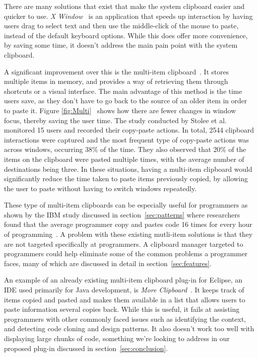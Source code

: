 \documentclass{acm_proc_article-sp}
\begin{document}
There are many solutions that exist that make the system clipboard easier and quicker to use. \textit{X Window}~\cite{overlapWindow} is an application that speeds up interaction by having users drag to select text and then use the middle-click of the mouse to paste, instead of the default keyboard options. While this does offer more convenience, by saving some time, it doesn't address the main pain point with the system clipboard.

A significant improvement over this is the multi-item clipboard~\cite{cpHabits}. It stores multiple items in memory, and provides a way of retrieving them through shortcuts or a visual interface. The main advantage of this method is the time users save, as they don't have to go back to the source of an older item in order to paste it. Figure \ref{fig:Multi}~\cite{cpHabits} shows how there are fewer changes in window focus, thereby saving the user time. The study conducted by Stolee et al. monitored 15 users and recorded their copy-paste actions. In total, 2544 clipboard interactions were captured and the most frequent type of copy-paste actions was across windows, occurring 38\% of the time. They also observed that 20\% of the items on the clipboard were pasted multiple times, with the average number of destinations being three. In these situations, having a multi-item clipboard would significantly reduce the time taken to paste items previously copied, by allowing the user to paste without having to switch windows repeatedly.

These type of multi-item clipboards can be especially useful for programmers as shown by the IBM study discussed in section~\ref{sec:patterns} where researchers found that the average programmer copy and pastes code 16 times for every hour of programming~\cite{ooplCP}. A problem with these existing mutli-item solutions is that they are not targeted specifically at programmers. A clipboard manager targeted to programmers could help eliminate some of the common problems a programmer faces, many of which are discussed in detail in section~\ref{sec:features}.

An example of an already existing multi-item clipboard plug-in for Eclipse, an IDE used primarily for Java development, is \textit{More Clipboard}~\cite{moreclipboard}. It keeps track of items copied and pasted and makes them available in a list that allows users to paste information several copies back. While this is useful, it fails at assisting programmers with other commonly faced issues such as identifying the context, and detecting code cloning and design patterns. It also doesn't work too well with displaying large chunks of code, something we're looking to address in our proposed plug-in discussed in section~\ref{sec:conclusion}.
\end{document}
